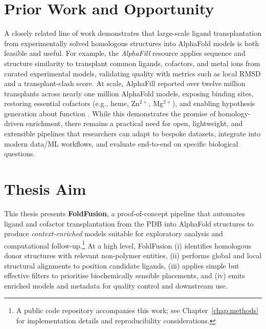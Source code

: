 \section{Prior Work and Opportunity}
A closely related line of work demonstrates that large-scale ligand transplantation from experimentally solved homologous structures into AlphaFold models is both feasible and useful. For example, the \textit{AlphaFill} resource applies sequence and structure similarity to transplant common ligands, cofactors, and metal ions from curated experimental models, validating quality with metrics such as local RMSD and a transplant-clash score. At scale, AlphaFill reported over twelve million transplants across nearly one million AlphaFold models, exposing binding sites, restoring essential cofactors (e.g., heme, Zn$^{2+}$, Mg$^{2+}$), and enabling hypothesis generation about function \cite{hekkelmanAlphaFillEnrichingAlphaFold2023}. While this demonstrates the promise of homology-driven enrichment, there remains a practical need for open, lightweight, and extensible pipelines that researchers can adapt to bespoke datasets, integrate into modern data/ML workflows, and evaluate end-to-end on specific biological questions.

\section{Thesis Aim}
This thesis presents \textbf{FoldFusion}, a proof-of-concept pipeline that automates ligand and cofactor transplantation from the PDB into AlphaFold structures to produce \emph{context-enriched} models suitable for exploratory analysis and computational follow-up.\footnote{A public code repository accompanies this work; see Chapter~\ref{chap:methods} for implementation details and reproducibility considerations.} At a high level, FoldFusion (i) identifies homologous donor structures with relevant non-polymer entities, (ii) performs global and local structural alignments to position candidate ligands, (iii) applies simple but effective filters to prioritise biochemically sensible placements, and (iv) emits enriched models and metadata for quality control and downstream use.

